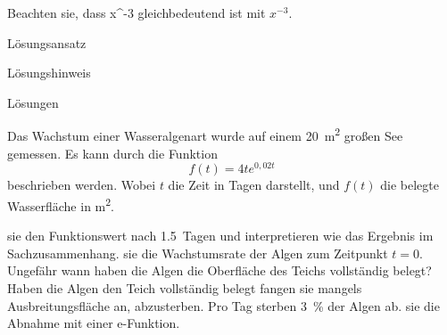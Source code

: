 \documentclass[11pt, a5paper, landscape, final]{scrartcl}
\begin{document}
	\begin{center}
		Beachten sie, dass x\textasciicircum-3 gleichbedeutend ist mit $x^{-3}$.
		\begin{multicols}{3}
			Lösungsansatz \\
			\columnbreak
			
			Lösungshinweis \\
			\columnbreak
		
			Lösungen \\
		\end{multicols}
	\end{center}
	\clearpage
	
	\begin{aufgabe}
		Das Wachstum einer Wasseralgenart wurde auf einem \SI{20}{\square\meter} großen See gemessen. Es kann durch die Funktion
		\[ f(t) = 4te^{0,02t} \]
		beschrieben werden. Wobei $t$ die Zeit in \si{Tagen} darstellt, und $f(t)$ die belegte Wasserfläche in \si{\square\meter}.
		
		\begin{teilaufgaben}
			\teilaufgabe {} sie den Funktionswert nach \SI{1,5}{Tagen} und interpretieren wie das Ergebnis im Sachzusammenhang. 
			\teilaufgabe {} sie die Wachstumsrate der Algen zum Zeitpunkt $t=0$.
			\teilaufgabe Ungefähr wann haben die Algen die Oberfläche des Teichs vollständig belegt?\\
			\teilaufgabe Haben die Algen den Teich vollständig belegt fangen sie mangels Ausbreitungsfläche an, abzusterben. Pro Tag sterben \SI{3}{\%} der Algen ab.  sie die Abnahme mit einer e-Funktion.
		\end{teilaufgaben}
	\end{aufgabe}
	\clearpage
\end{document}
